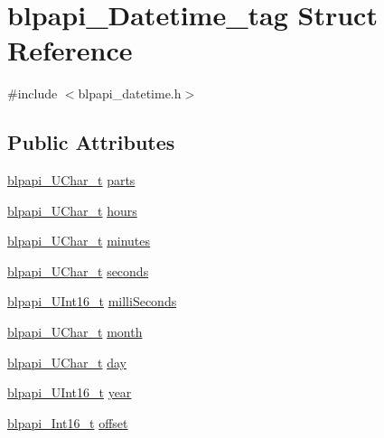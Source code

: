 \hypertarget{structblpapi___datetime__tag}{}\section{blpapi\+\_\+\+Datetime\+\_\+tag Struct Reference}
\label{structblpapi___datetime__tag}


{\ttfamily \#include $<$blpapi\+\_\+datetime.\+h$>$}

\subsection*{Public Attributes}
\begin{DoxyCompactItemize}
\item 
\hyperlink{blpapi__types_8h_afeb012c2037260254833cc5c4a893908}{blpapi\+\_\+\+U\+Char\+\_\+t} \hyperlink{structblpapi___datetime__tag_afc7e10f10f66a3ba2a633ea6e5159f32}{parts}
\item 
\hyperlink{blpapi__types_8h_afeb012c2037260254833cc5c4a893908}{blpapi\+\_\+\+U\+Char\+\_\+t} \hyperlink{structblpapi___datetime__tag_a086de25506d9608b81b646899ef49bb5}{hours}
\item 
\hyperlink{blpapi__types_8h_afeb012c2037260254833cc5c4a893908}{blpapi\+\_\+\+U\+Char\+\_\+t} \hyperlink{structblpapi___datetime__tag_afebdd321673ae23b017cf038c5e039e6}{minutes}
\item 
\hyperlink{blpapi__types_8h_afeb012c2037260254833cc5c4a893908}{blpapi\+\_\+\+U\+Char\+\_\+t} \hyperlink{structblpapi___datetime__tag_a67495f8ba256bc97aaf5a2ae08bad645}{seconds}
\item 
\hyperlink{blpapi__types_8h_abac1f8140b56f2486e2c45e9ad305f55}{blpapi\+\_\+\+U\+Int16\+\_\+t} \hyperlink{structblpapi___datetime__tag_a380bba06b9ccefacfd679480e3373780}{milli\+Seconds}
\item 
\hyperlink{blpapi__types_8h_afeb012c2037260254833cc5c4a893908}{blpapi\+\_\+\+U\+Char\+\_\+t} \hyperlink{structblpapi___datetime__tag_a11318966911210526d5f5a8465785822}{month}
\item 
\hyperlink{blpapi__types_8h_afeb012c2037260254833cc5c4a893908}{blpapi\+\_\+\+U\+Char\+\_\+t} \hyperlink{structblpapi___datetime__tag_a03ef3fef126d8056e584317848b0791b}{day}
\item 
\hyperlink{blpapi__types_8h_abac1f8140b56f2486e2c45e9ad305f55}{blpapi\+\_\+\+U\+Int16\+\_\+t} \hyperlink{structblpapi___datetime__tag_a1860a800fe40ad608105be2ad1b1ec8a}{year}
\item 
\hyperlink{blpapi__types_8h_ab7f2666fa28a7f68427d22cc86f43625}{blpapi\+\_\+\+Int16\+\_\+t} \hyperlink{structblpapi___datetime__tag_ac85c4f85aedce40d1992f377ba3e8445}{offset}
\end{DoxyCompactItemize}



